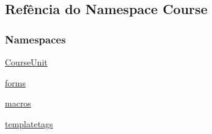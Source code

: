 \hypertarget{namespaceCourse}{}\subsection{Refência do Namespace Course}
\label{namespaceCourse}
\subsubsection*{Namespaces}
\begin{DoxyCompactItemize}
\item 
 \hyperlink{namespaceCourse_1_1CourseUnit}{Course\+Unit}
\item 
 \hyperlink{namespaceCourse_1_1forms}{forms}
\item 
 \hyperlink{namespaceCourse_1_1macros}{macros}
\item 
 \hyperlink{namespaceCourse_1_1templatetags}{templatetags}
\end{DoxyCompactItemize}
